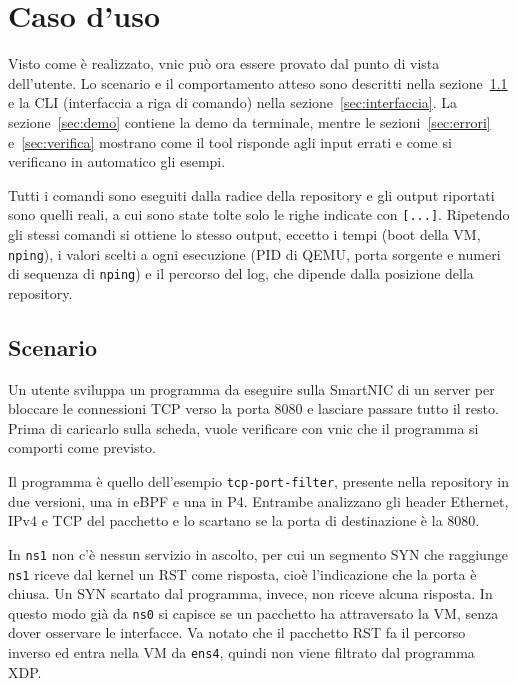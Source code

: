 \chapter{Caso d'uso}\label{ch:casouso}

Visto come è realizzato, vnic può ora essere provato dal punto di vista dell'utente. Lo scenario e il comportamento atteso sono descritti nella sezione~\ref{sec:scenario} e la CLI (interfaccia a riga di comando) nella sezione~\ref{sec:interfaccia}. La sezione~\ref{sec:demo} contiene la demo da terminale, mentre le sezioni~\ref{sec:errori} e~\ref{sec:verifica} mostrano come il tool risponde agli input errati e come si verificano in automatico gli esempi.

Tutti i comandi sono eseguiti dalla radice della repository e gli output riportati sono quelli reali, a cui sono state tolte solo le righe indicate con \texttt{[...]}. Ripetendo gli stessi comandi si ottiene lo stesso output, eccetto i tempi (boot della VM, \texttt{nping}), i valori scelti a ogni esecuzione (PID di QEMU, porta sorgente e numeri di sequenza di \texttt{nping}) e il percorso del log, che dipende dalla posizione della repository.

\section{Scenario}\label{sec:scenario}

Un utente sviluppa un programma da eseguire sulla SmartNIC di un server per bloccare le connessioni TCP verso la porta 8080 e lasciare passare tutto il resto. Prima di caricarlo sulla scheda, vuole verificare con vnic che il programma si comporti come previsto.

Il programma è quello dell'esempio \texttt{tcp-port-filter}, presente nella repository in due versioni, una in eBPF e una in P4. Entrambe analizzano gli header Ethernet, IPv4 e TCP del pacchetto e lo scartano se la porta di destinazione è la 8080.

In \texttt{ns1} non c'è nessun servizio in ascolto, per cui un segmento SYN che raggiunge \texttt{ns1} riceve dal kernel un RST come risposta, cioè l'indicazione che la porta è chiusa. Un SYN scartato dal programma, invece, non riceve alcuna risposta. In questo modo già da \texttt{ns0} si capisce se un pacchetto ha attraversato la VM, senza dover osservare le interfacce. Va notato che il pacchetto RST fa il percorso inverso ed entra nella VM da \texttt{ens4}, quindi non viene filtrato dal programma XDP.

